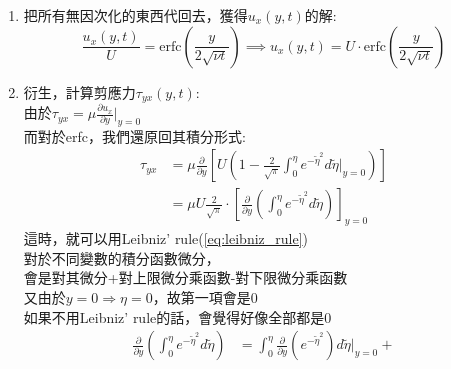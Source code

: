 \documentclass[../main.tex]{subfiles}
\begin{document}
\begin{itemize}
\begin{enumerate}
\begin{itemize}
\begin{enumerate}
        \begin{align}
          -1 &= C_2 \cdot \frac{\sqrt{\pi}}{2} \nonumber\\
          C_2 &= -\frac{2}{\sqrt{\pi}}
        \end{align}
        故最後解為:
        \begin{equation}
          \phi(\eta) = 1 - \frac{2}{\sqrt{\pi}} \int_0^{\eta} e^{-\tilde\eta^2} d\tilde\eta = 1-\text{erf}(\eta) = \text{erfc}(\eta)
        \end{equation}
        而後面那項就是Error Function，被1減掉後，又變成Complementary Error Function
        \item 把所有無因次化的東西代回去，獲得$u_x(y,t)$的解:
        \begin{equation}
          \frac{u_x(y,t)}{U} = \text{erfc}\left(
            \frac{y}{2\sqrt{\nu t}}
          \right) \implies
          \boxed{u_x(y,t) = U \cdot \text{erfc}\left(
            \frac{y}{2\sqrt{\nu t}}
          \right)}
        \end{equation}
        \item 衍生，計算剪應力$\tau_{yx}(y,t)$:\\
        由於$\tau_{yx} = \mu \frac{\partial u_x}{\partial y}\big|_{y=0}$\\
        而對於erfc，我們還原回其積分形式:
        \begin{align}
          \tau_{yx} &= \mu \frac{\partial }{\partial y} \left[
            U \left(
              1 - \frac{2}{\sqrt{\pi}} \int_0^{\eta} e^{-\tilde\eta^2} d\tilde\eta\big|_{y=0}
            \right)
          \right] \nonumber\\
          &= \mu U \frac{2}{\sqrt{\pi}} \cdot\left[
            \frac{\partial }{\partial y} \left(\int_0^{\eta} e^{-\tilde\eta^2} d\tilde\eta\right)
          \right]_{y=0}
        \end{align}
        這時，就可以用Leibniz' rule(\ref{eq:leibniz_rule})\\
        對於不同變數的積分函數微分，\\
        會是對其微分+對上限微分乘函數-對下限微分乘函數\\
        又由於$y=0 \Rightarrow \eta = 0$，故第一項會是0\\
        如果不用Leibniz' rule的話，會覺得好像全部都是0
        \begin{align}
          \frac{\partial }{\partial y} \left(\int_0^{\eta} e^{-\tilde\eta^2} d\tilde\eta\right) &=
          \int_0^{\eta} \frac{\partial }{\partial y}(e^{-\tilde\eta^2}) d\tilde\eta\big|_{y=0} +

\end{align}
\end{enumerate}
\end{itemize}
\end{enumerate}
\end{itemize}
\end{document}
